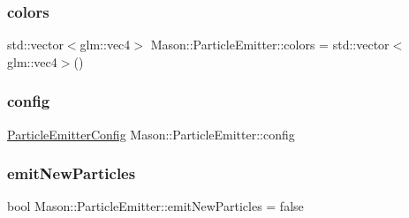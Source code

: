 \hypertarget{class_mason_1_1_particle_emitter_a18c989ce7de75ba90f2b9f40f36beed1}{}\label{class_mason_1_1_particle_emitter_a18c989ce7de75ba90f2b9f40f36beed1} 
\subsubsection{\texorpdfstring{colors}{colors}}
{\footnotesize\ttfamily std\+::vector$<$glm\+::vec4$>$ Mason\+::\+Particle\+Emitter\+::colors = std\+::vector$<$glm\+::vec4$>$()\hspace{0.3cm}{\ttfamily [protected]}}

\hypertarget{class_mason_1_1_particle_emitter_a86af1c5bfa7b301f334473b458d16ba0}{}\label{class_mason_1_1_particle_emitter_a86af1c5bfa7b301f334473b458d16ba0} 
\subsubsection{\texorpdfstring{config}{config}}
{\footnotesize\ttfamily \hyperlink{struct_mason_1_1_particle_emitter_config}{Particle\+Emitter\+Config} Mason\+::\+Particle\+Emitter\+::config\hspace{0.3cm}{\ttfamily [protected]}}

\hypertarget{class_mason_1_1_particle_emitter_a615f89f70c414781aa518c8a035312bb}{}\label{class_mason_1_1_particle_emitter_a615f89f70c414781aa518c8a035312bb} 
\subsubsection{\texorpdfstring{emit\+New\+Particles}{emitNewParticles}}
{\footnotesize\ttfamily bool Mason\+::\+Particle\+Emitter\+::emit\+New\+Particles = false\hspace{0.3cm}{\ttfamily [protected]}}

\hypertarget{class_mason_1_1_particle_emitter_a79acae3c8f64f592e8868cb166b1a1ce}{}\label{class_mason_1_1_particle_emitter_a79acae3c8f64f592e8868cb166b1a1ce} 
